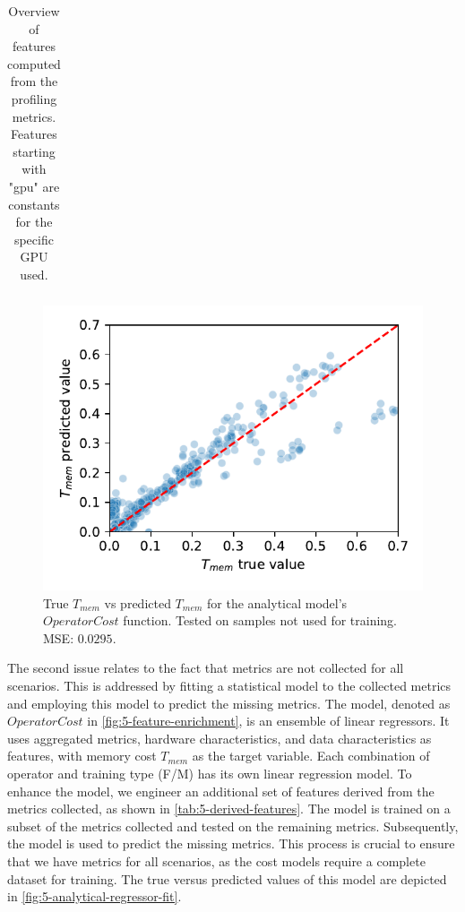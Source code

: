 \begin{table}[ht]
\begin{tabular}{p{0.19\linewidth}p{0.37\linewidth}>{\footnotesize}p{0.35\linewidth}}
    \bottomrule
  \end{tabular}
  \caption[Derived features]{Overview of features computed from the profiling metrics. Features starting with "gpu" are constants for the specific GPU used.}
  \label{tab:5-derived-features}
\end{table}
\begin{figure}[ht]
  \centering
  \includegraphics[width=0.5\linewidth]{chapters/05_cost_estimation/figures/analytical-regressor-fit.pdf}
  \caption[Analytical model memory cost prediction vs true values]{True $T_{mem}$ vs predicted $T_{mem}$ for the analytical model's $OperatorCost$ function. Tested on samples not used for training. MSE: $0.0295$.}
  \label{fig:5-analytical-regressor-fit}
\end{figure}
The second issue relates to the fact that metrics are not collected for all scenarios. This is addressed by fitting a statistical model to the collected metrics and employing this model to predict the missing metrics. The model, denoted as $OperatorCost$ in \autoref{fig:5-feature-enrichment}, is an ensemble of linear regressors. It uses aggregated metrics, hardware characteristics, and data characteristics as features, with memory cost $T_{mem}$ as the target variable. Each combination of operator and training type (F/M) has its own linear regression model.
To enhance the model, we engineer an additional set of features derived from the metrics collected, as shown in \autoref{tab:5-derived-features}.
The model is trained on a subset of the metrics collected and tested on the remaining metrics. Subsequently, the model is used to predict the missing metrics. This process is crucial to ensure that we have metrics for all scenarios, as the cost models require a complete dataset for training. The true versus predicted values of this model are depicted in \autoref{fig:5-analytical-regressor-fit}.



